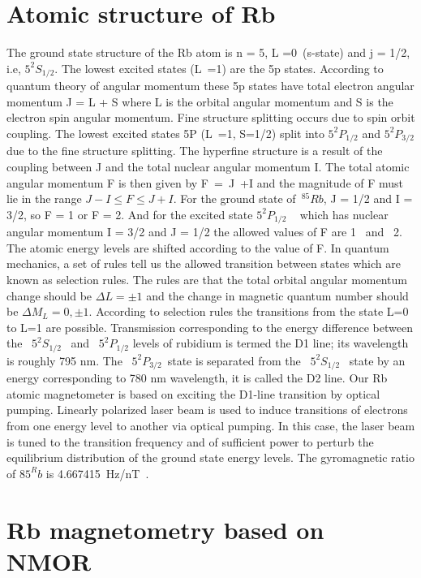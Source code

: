 \section{Atomic structure of Rb }
\label{sec:Rb structure} 
The ground state structure of the Rb atom is n = 5, L =0~(s-state) and j = 1/2, i.e, $5^2S_{1/2}$. The lowest excited states (L~=1) are the 5p states. According to quantum theory of angular momentum these 5p states have total electron angular momentum J = L + S where L is the orbital angular momentum and S is the electron spin angular momentum. Fine structure splitting occurs due to spin orbit coupling.  The lowest excited states 5P (L~=1, S=1/2) split into  $5^2P_{1/2}$ and $5^2P_{3/2}$  due to the fine structure splitting. The hyperfine structure is a result of the coupling between J and the total nuclear angular momentum I. The total atomic angular momentum F is then given by F~=~J~+I  and the magnitude of F must lie in the range
$J - I \leq F \leq J + I$. For the ground state of~$^{85}{Rb}$, J = 1/2 and I = 3/2, so F = 1 or F = 2. And  for the excited state $5^2P_{1/2}$ ~  which has nuclear angular momentum I = 3/2 and J = 1/2  the allowed values of F are  1 ~and~ 2. The atomic energy levels are shifted according to the value of F. In quantum mechanics, a set of rules tell us the allowed transition between states which are known as selection rules. The rules are that the total orbital angular momentum change should be $\Delta L= \pm 1$ and the change in magnetic quantum number should be $\Delta M_L= 0,\pm 1$. According to selection rules the transitions from the state L=0 to L=1 are possible. Transmission corresponding to the energy difference between the ~$5^2S_{1/2}$~ and~ $5^2P_{1/2}$ levels of rubidium is termed the D1 line; its wavelength is roughly 795 nm\cite{doe:website}.  The ~$5^2P_{3/2}$~state is separated from the ~$5^2S_{1/2}$~ state by an energy corresponding to 780 nm wavelength, it is called the D2 line. Our Rb atomic magnetometer is based on exciting the D1-line transition by optical pumping.  Linearly polarized laser beam is used to induce transitions of electrons from one energy level to another via optical pumping. In this case, the laser beam is tuned to the transition frequency and of sufficient power to perturb the equilibrium distribution of the ground state energy levels. The gyromagnetic ratio of ${85}^Rb$ is 4.667415~Hz/nT~\cite{bib:rb-gyro-reference}.

\section{Rb magnetometry based on NMOR}

